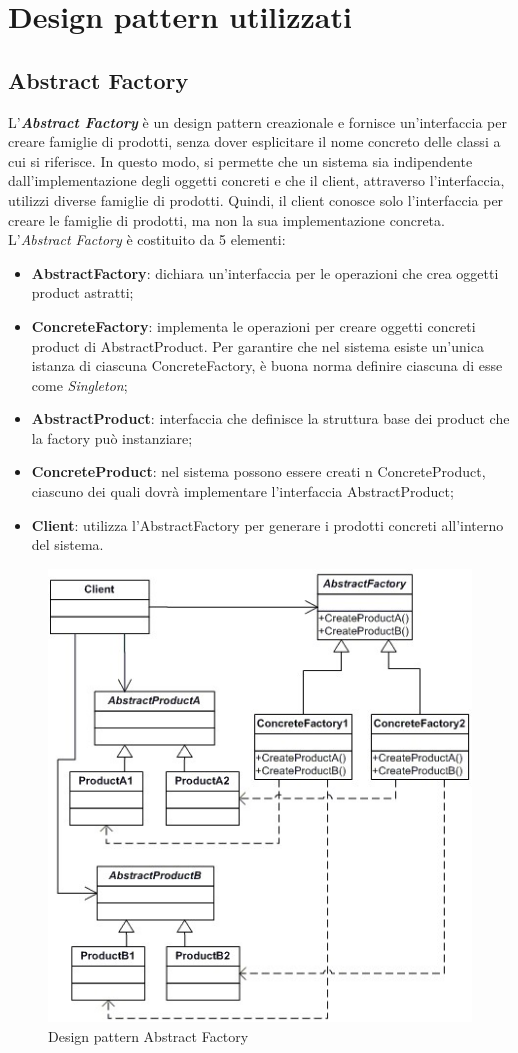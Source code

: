 \newpage
\section{Design pattern utilizzati}

\subsection{Abstract Factory}
L'\textbf{\textit{Abstract Factory}} è un design pattern creazionale e fornisce un'interfaccia per creare famiglie di prodotti, senza dover esplicitare il nome concreto delle classi a cui si riferisce. In questo modo, si permette che un sistema sia indipendente dall'implementazione degli oggetti concreti e che il client, attraverso l'interfaccia, utilizzi diverse famiglie di prodotti. Quindi, il client conosce solo l’interfaccia per creare le famiglie di prodotti, ma non la sua implementazione concreta.
L’\textit{Abstract Factory} è costituito da 5 elementi:
\begin{itemize}
	\item \textbf{AbstractFactory}: dichiara un'interfaccia per le operazioni che crea oggetti product astratti;
	\item \textbf{ConcreteFactory}: implementa le operazioni per creare oggetti concreti product di AbstractProduct. Per garantire che nel sistema esiste un’unica istanza di ciascuna ConcreteFactory, è buona norma definire ciascuna di esse come \textit{Singleton};
	\item \textbf{AbstractProduct}: interfaccia che definisce la struttura base dei product che la factory può instanziare;
	\item \textbf{ConcreteProduct}: nel sistema possono essere creati n ConcreteProduct, ciascuno dei quali dovrà implementare l’interfaccia AbstractProduct;
	\item \textbf{Client}: utilizza l’AbstractFactory per generare i prodotti concreti all’interno del sistema.
\end{itemize}

\begin{figure}[H]
	\centering
	\includegraphics[width=0.5\linewidth]{IMG/abstract-pattern}
	\caption{Design pattern Abstract Factory}
\end{figure}

